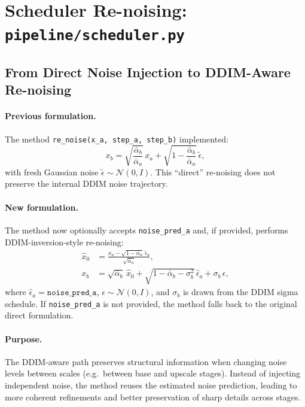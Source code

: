 \documentclass[11pt,a4paper]{article}
\newcommand{\file}[1]{\texttt{#1}}
\newcommand{\fn}[1]{\texttt{#1}}
\begin{document}
\section{Scheduler Re-noising: \file{pipeline/scheduler.py}}

\subsection{From Direct Noise Injection to DDIM-Aware Re-noising}

\paragraph{Previous formulation.}
The method \fn{re\_noise(x\_a, step\_a, step\_b)} implemented:
\begin{equation}
    x_b = \sqrt{\frac{\bar{\alpha}_b}{\bar{\alpha}_a}}\,x_a
          + \sqrt{1 - \frac{\bar{\alpha}_b}{\bar{\alpha}_a}}\,\tilde{\epsilon},
\end{equation}
with fresh Gaussian noise \(\tilde{\epsilon}\sim\mathcal{N}(0,I)\).
This ``direct'' re-noising does not preserve the internal DDIM noise trajectory.

\paragraph{New formulation.}
The method now optionally accepts \fn{noise\_pred\_a} and, if provided, performs DDIM-inversion-style re-noising:
\begin{align}
    \hat{x}_0 &= \frac{x_a - \sqrt{1-\bar{\alpha}_a}\,\hat{\epsilon}_a}{\sqrt{\bar{\alpha}_a}},\\
    x_b &= \sqrt{\bar{\alpha}_b}\,\hat{x}_0
           + \sqrt{1-\bar{\alpha}_b-\sigma_b^2}\,\hat{\epsilon}_a
           + \sigma_b\,\epsilon,
\end{align}
where \(\hat{\epsilon}_a=\texttt{noise\_pred\_a}\), \(\epsilon\sim\mathcal{N}(0,I)\), and \(\sigma_b\) is drawn from the DDIM sigma schedule.
If \fn{noise\_pred\_a} is not provided, the method falls back to the original direct formulation.

\paragraph{Purpose.}
The DDIM-aware path preserves structural information when changing noise levels between scales (e.g.\ between base and upscale stages).
Instead of injecting independent noise, the method reuses the estimated noise prediction, leading to more coherent refinements and better preservation of sharp details across stages.
\end{document}
